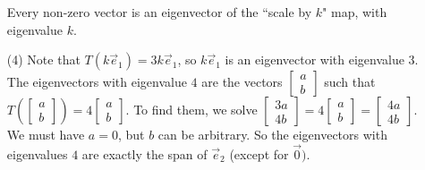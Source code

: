 \begin{SaveQuestion}
\begin{enumerate}
		Every non-zero vector is an eigenvector of the ``scale by $k$" map, with eigenvalue $k. $
        \item[(4)] Note that $T(k\vec e_1) = 3k \vec e_1$, so $k\vec e_1$ is an eigenvector with eigenvalue 3. The eigenvectors with eigenvalue $4$ are the vectors  $\begin{bmatrix} a \\ b \end{bmatrix}$ such that $T(\begin{bmatrix} a \\ b \end{bmatrix}) = 4 \begin{bmatrix} a \\ b \end{bmatrix}$. To find them,  we solve $ \begin{bmatrix} 3a  \\ 4 b \end{bmatrix} = 
		4 \begin{bmatrix} a \\ b \end{bmatrix} =   \begin{bmatrix} 4a \\ 4b \end{bmatrix} $. We must have $a = 0$, but $b$ can be arbitrary. So the eigenvectors with eigenvalues $4$ are exactly the span of $\vec e_2$ (except for $\vec 0)$.
    \end{enumerate}
\end{SaveQuestion}


